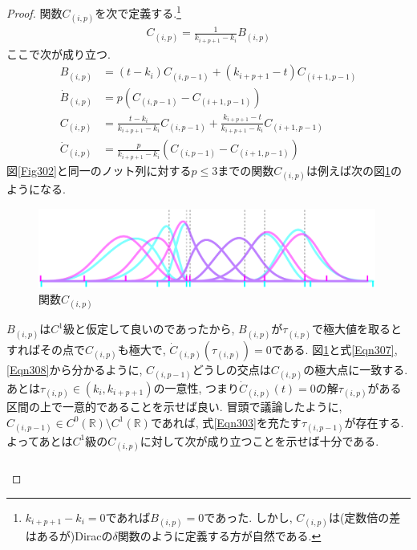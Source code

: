 \documentclass{jsarticle}
\newcommand\setR{\mathbb{R}}
\newcommand\Pare[1]{\left(#1\right)}
\theoremstyle{definition}%
\begin{document}
\begin{proof}
    関数$C_{(i,p)}$を次で定義する.\footnote{$k_{i+p+1}-k_i=0$であれば$B_{(i,p)}=0$であった. しかし, $C_{(i,p)}$は(定数倍の差はあるが)Diracの$\delta$関数のように定義する方が自然である.}
    \begin{align}
        C_{(i,p)}
        =\frac{1}{k_{i+p+1}-k_{i}}B_{(i,p)}
    \end{align}
    ここで次が成り立つ.
    \begin{align}
        B_{(i,p)}&=(t-k_{i})C_{(i,p-1)}+(k_{i+p+1}-t)C_{(i+1,p-1)} \\
        \dot{B}_{(i,p)}&=p(C_{(i,p-1)}-C_{(i+1,p-1)}) \\
        \label{Eqn307}
        C_{(i,p)}&=\frac{t-k_{i}}{k_{i+p+1}-k_{i}}C_{(i,p-1)}+\frac{k_{i+p+1}-t}{k_{i+p+1}-k_{i}}C_{(i+1,p-1)} \\
        \label{Eqn308}
        \dot{C}_{(i,p)}&=\frac{p}{k_{i+p+1}-k_{i}}\Pare{C_{(i,p-1)}-C_{(i+1,p-1)}}
    \end{align}
    図\ref{Fig302}と同一のノット列に対する$p\leq 3$までの関数$C_{(i,p)}$は例えば次の図\ref{Fig305}のようになる.
    \addtocounter{footnote}{-1}
    \begin{figure}[H]
    	\centering
        \includegraphics[page=2,clip,width=111mm]{figA.pdf}
    	\caption{関数$C_{(i,p)}$\protect\footnotemark}
    	\label{Fig305}
    \end{figure}
    $B_{(i,p)}$は$C^1$級と仮定して良いのであったから, $B_{(i,p)}$が$\tau_{(i,p)}$で極大値を取るとすればその点で$C_{(i,p)}$も極大で, $\dot{C}_{(i,p)}(\tau_{(i,p)})=0$である.
    図\ref{Fig305}と式\eqref{Eqn307}, \eqref{Eqn308}から分かるように, $C_{(i,p-1)}$どうしの交点は$C_{(i,p)}$の極大点に一致する.
    あとは$\tau_{(i,p)}\in \Pare{k_{i},k_{i+p+1}}$の一意性, つまり$\dot{C}_{(i,p)}(t)=0$の解$\tau_{(i,p)}$がある区間の上で一意的であることを示せば良い.
    冒頭で議論したように, $C_{(i,p-1)}\in C^0(\setR)\setminus C^1(\setR)$であれば, 式\eqref{Eqn303}を充たす$\tau_{(i,p-1)}$が存在する.
    よってあとは$C^1$級の$C_{(i,p)}$に対して次が成り立つことを示せば十分である.
    \begin{align}
        \begin{aligned}

\end{aligned}
\end{align}
\end{proof}
\end{document}
